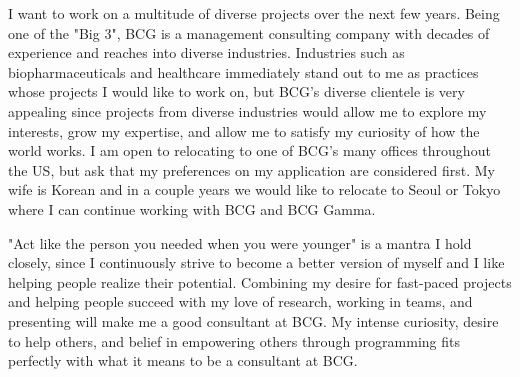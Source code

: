 \documentclass[11pt, letterpaper]{CV_latex_class}
\begin{document}
\begin{cvletter}

\hspace{1em} I want to work on a multitude of diverse projects over the next few years. Being one of the "Big 3", BCG is a management consulting company with decades of experience and reaches into diverse industries. Industries such as biopharmaceuticals and healthcare immediately stand out to me as practices whose projects I would like to work on, but BCG's diverse clientele is very appealing since projects from diverse industries would allow me to explore my interests, grow my expertise, and allow me to satisfy my curiosity of how the world works. I am open to relocating to one of BCG's many offices throughout the US, but ask that my preferences on my application are considered first. My wife is Korean and in a couple years we would like to relocate to Seoul or Tokyo where I can continue working with BCG and BCG Gamma.


\hspace{1em} "Act like the person you needed when you were younger" is a mantra I hold closely, since I continuously strive to become a better version of myself and I like helping people realize their potential. Combining my desire for fast-paced projects and helping people succeed with my love of research, working in teams, and presenting will make me a good consultant at BCG. My intense curiosity, desire to help others, and belief in empowering others through programming fits perfectly with what it means to be a consultant at BCG.


\end{cvletter}

\makeletterclosing

\end{document}
